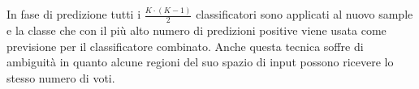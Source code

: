 In fase di predizione tutti i $\frac{K \cdot (K - 1)}{2}$ classificatori sono
applicati al nuovo sample e la classe che con il più alto numero di predizioni
positive viene usata come previsione per il classificatore combinato. Anche
questa tecnica soffre di ambiguità in quanto alcune regioni del suo spazio di
input possono ricevere lo stesso numero di voti.